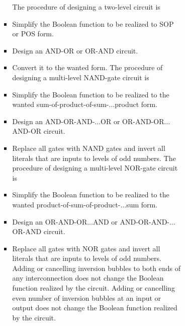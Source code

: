 \documentclass[a4paper,12pt]{article}
\begin{document}
\begin{itemize}
\begin{itemize}
\begin{itemize}
\begin{itemize}
\begin{itemize}
\begin{itemize}
\begin{itemize}
The procedure of designing a two-level circuit is
\ben
\item Simplify the Boolean function to be realized to SOP or POS form.
\item Design an AND-OR or OR-AND circuit.
\item Convert it to the wanted form.
\een
{}
The procedure of designing a multi-level NAND-gate circuit is
\ben
\item Simplify the Boolean function to be realized to the wanted sum-of-product-of-sum-$\ldots$product form.
\item Design an AND-OR-AND-$\ldots$OR or OR-AND-OR$\ldots$AND-OR circuit.
\item Replace all gates with NAND gates and invert all literals that are inputs to levels of odd numbers.
\een
The procedure of designing a multi-level NOR-gate circuit is
\ben
\item Simplify the Boolean function to be realized to the wanted product-of-sum-of-product-$\ldots$sum form.
\item Design an OR-AND-OR$\ldots$AND or AND-OR-AND-$\ldots$OR-AND circuit.
\item Replace all gates with NOR gates and invert all literals that are inputs to levels of odd numbers.
\een
{}
Adding or cancelling inversion bubbles to both ends of any interconnection does not change the Boolean function realized by the circuit. Adding or cancelling even number of inversion bubbles at an input or output does not change the Boolean function realized by the circuit.


\end{itemize}
\end{itemize}
\end{itemize}
\end{itemize}
\end{itemize}
\end{itemize}
\end{itemize}
\end{document}

